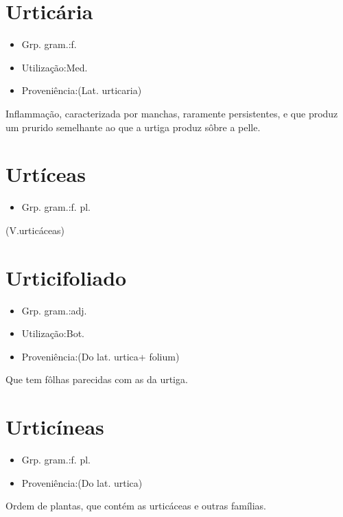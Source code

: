 \documentclass{article}
\begin{document}
\section{Urticária}
\begin{itemize}
\item {Grp. gram.:f.}
\end{itemize}
\begin{itemize}
\item {Utilização:Med.}
\end{itemize}
\begin{itemize}
\item {Proveniência:(Lat. \textunderscore urticaria\textunderscore )}
\end{itemize}
Inflammação, caracterizada por manchas, raramente persistentes, e que produz um prurido semelhante ao que a urtiga produz sôbre a pelle.
\section{Urtíceas}
\begin{itemize}
\item {Grp. gram.:f. pl.}
\end{itemize}
(V.urticáceas)
\section{Urticifoliado}
\begin{itemize}
\item {Grp. gram.:adj.}
\end{itemize}
\begin{itemize}
\item {Utilização:Bot.}
\end{itemize}
\begin{itemize}
\item {Proveniência:(Do lat. \textunderscore urtica\textunderscore  + \textunderscore folium\textunderscore )}
\end{itemize}
Que tem fôlhas parecidas com as da urtiga.
\section{Urticíneas}
\begin{itemize}
\item {Grp. gram.:f. pl.}
\end{itemize}
\begin{itemize}
\item {Proveniência:(Do lat. \textunderscore urtica\textunderscore )}
\end{itemize}
Ordem de plantas, que contém as urticáceas e outras famílias.
\end{document}
